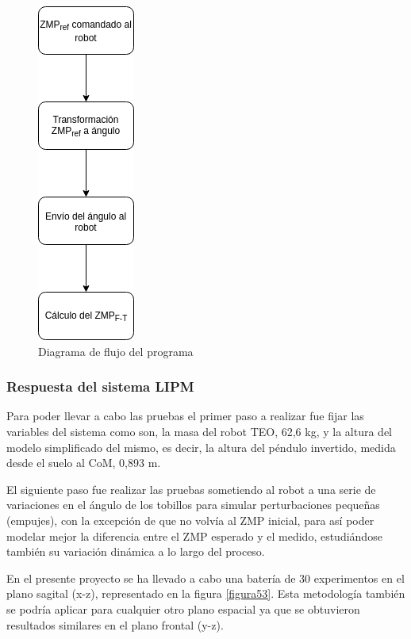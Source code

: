 \begin{figure}[H]
\centering
\includegraphics[scale=0.5]{imagenes/apartado_5/52_diagrama_flujo1}
\caption{Diagrama de flujo del programa}
\label{figura52}
\end{figure}


\subsubsection{Respuesta del sistema LIPM}

Para poder llevar a cabo las pruebas el primer paso a realizar fue fijar las variables del sistema como son, la masa del robot TEO, 62,6 kg, y la altura del modelo simplificado del mismo, es decir, la altura del péndulo invertido, medida desde el suelo al CoM, 0,893 m.

El siguiente paso fue realizar las pruebas sometiendo al robot a una serie de variaciones en el ángulo de los tobillos para simular perturbaciones pequeñas (empujes), con la excepción de que no volvía al ZMP inicial, para así poder modelar mejor la diferencia entre el ZMP esperado y el medido, estudiándose también su variación dinámica a lo largo del proceso. 

En el presente proyecto se ha llevado a cabo una batería de 30 experimentos en el plano sagital (x-z), representado en la figura \ref{figura53}. Esta metodología también se podría aplicar para cualquier otro plano espacial ya que se obtuvieron resultados similares en el plano frontal (y-z).


